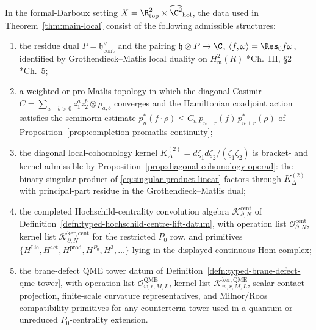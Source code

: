 \begin{lem}
\label{lem:admissible-formal-darboux-data}
In the formal-Darboux setting
\(X=\R^2_{\mathrm{top}}\times\widehat{\C^2}_{\mathrm{hol}}\), the
data used in Theorem~\ref{thm:main-local} consist of the following
admissible structures:
\begin{enumerate}[label=\textup{(\roman*)}]
  \item the residue dual
        \(P=\mathfrak h^\vee_{\mathrm{cont}}\) and the pairing
        \(\mathfrak h\otimes P\to\C\),
        \(\langle f,\omega\rangle=\Res_0 f\omega\), identified by
        Grothendieck--Matlis local duality on
        \(H^2_{\mathfrak m}(R)\)
        \cite{hartshorne-local-cohomology}*{Ch.~III, \S2}
        \cite{kunz-residues-duality}*{Ch.~5};
  \item a weighted or pro-Matlis topology in which the diagonal Casimir
        \(C=\sum_{a+b>0}z_1^az_2^b\otimes\rho_{a,b}\) converges and the
        Hamiltonian coadjoint action satisfies the seminorm estimate
        \(p^*_n(f\cdot\rho)\leq C_n\,p_{n+r}(f)\,p^*_{n+r}(\rho)\)
        of Proposition~\ref{prop:completion-promatlis-continuity};
  \item the diagonal local-cohomology kernel
        \(K^{(2)}_\Delta=d\zeta_1d\zeta_2/(\zeta_1\zeta_2)\) is
        bracket- and kernel-admissible by
        Proposition~\ref{prop:diagonal-cohomology-operad}: the
        binary singular product of \eqref{eq:singular-product-linear} factors through
        \(K^{(2)}_\Delta\) with principal-part residue in the
        Grothendieck--Matlis dual;
  \item the completed Hochschild-centrality convolution algebra
        \(\mathcal K^{\mathrm{cent}}_{\partial,N}\) of
        Definition~\ref{defn:typed-hochschild-centre-lift-datum}, with
        operation list
        \(\mathcal O^{\mathrm{cent}}_{\partial,N}\), kernel list
        \(\mathcal K^{\mathrm{ker,cent}}_{\partial,N}\) for the
        restricted \(P_0\) row, and primitives
        \(\{H^{\mathrm{Lie}},H^{\mathrm{act}},H^{\mathrm{prod}},
        H^{P_0},H^3,\ldots\}\) lying in the displayed continuous Hom
        complex;
  \item the brane-defect QME tower datum of
        Definition~\ref{defn:typed-brane-defect-qme-tower}, with
        operation list \(\mathcal O^{\mathrm{QME}}_{w,r,M,L}\), kernel
        list \(\mathcal K^{\mathrm{ker,QME}}_{w,r,M,L}\), scalar-contact
        projection, finite-scale curvature representatives, and
        Milnor/Roos compatibility primitives for any counterterm tower
        used in a quantum or unreduced \(P_0\)-centrality extension.
\end{enumerate}
\end{lem}

